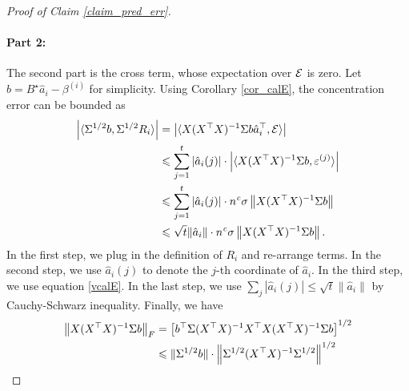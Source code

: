 \begin{proof}[Proof of Claim \ref{claim_pred_err}]
	\paragraph{Part 2:} The second part is the cross term, whose expectation over $\mathcal{E}$ is zero.
	Let $b = B^{\star} \hat{a}_i - \beta^{(i)}$ for simplicity.
	Using Corollary \ref{cor_calE}, the concentration error can be bounded as
	\begin{align*}
		{\left| {\langle \Sigma^{1/2}b, \Sigma^{1/2}R_i \rangle} \right|}
		&= {\left| {\langle X (X^{\top}X)^{-1} \Sigma b \hat{a}_i^{\top}, \mathcal{E} \rangle} \right|} \\
		&\leqslant \sum_{j=1}^t \left\lvert\hat{a}_i(j)\right\rvert \cdot {\left| {\langle X (X^{\top} X)^{-1} \Sigma b, \varepsilon^{(j)} \rangle} \right|} \\
		&\leqslant \sum_{j=1}^t \left\lvert\hat{a}_i(j)\right\rvert \cdot n^{{\mathit{c}}}\sigma \left\| X (X^{\top}X)^{-1} \Sigma b \right\| \\
		&\leqslant \sqrt{t} \|\hat{a}_i\| \cdot n^{{\mathit{c}}} \sigma \left\| X (X^{\top} X)^{-1} \Sigma b \right\|.
	\end{align*}
	In the first step, we plug in the definition of $R_i$ and re-arrange terms.
	In the second step, we use $\hat{a}_i(j)$ to denote the $j$-th coordinate of $\hat{a}_i$.
	In the third step, we use equation \eqref{vcalE}.
	In the last step, we use $\sum_j |\hat a_i(j)|\le \sqrt{t}\|\hat a_i\|$ by Cauchy-Schwarz inequality.
	Finally, we have
	\begin{align*}
		\bignormFro{ X(X^\top X)^{-1}\Sigma b} &=\left[ {b}^\top \Sigma (X^\top X)^{-1}X^\top X(X^\top X)^{-1}\Sigma b \right]^{1/2} \\
		&\le  \|\Sigma^{1/2} b \|  \cdot \left\| \Sigma^{1/2}(X^\top X)^{-1}\Sigma ^{1/2} \right\|^{1/2}  \\

\end{align*}
\end{proof}
